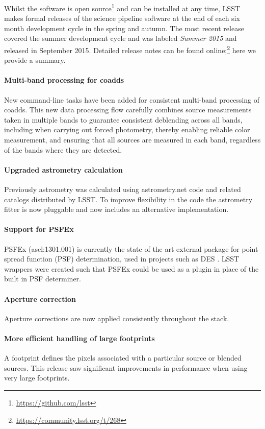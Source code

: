 \documentclass[11pt,twoside]{article}
\begin{document}
Whilst the software is open
source\footnote{\url{https://github.com/lsst}} and can be installed at
any time, LSST makes formal releases of the science pipeline software
at the end of each six month development cycle in the spring and
autumn. The most recent release covered the summer development cycle
and was labeled \emph{Summer 2015} and released in September
2015. Detailed release notes can be found
online;\footnote{\url{https://community.lsst.org/t/268}} here we
provide a summary.

\paragraph{Multi-band processing for coadds} New command-line tasks
have been added for consistent multi-band processing of coadds. This
new data processing flow carefully combines source measurements taken
in multiple bands to guarantee consistent deblending across all bands,
including when carrying out forced photometry, thereby enabling
reliable color measurement, and ensuring that all sources are
measured in each band, regardless of the bands where they are detected.

\paragraph{Upgraded astrometry calculation} Previously astrometry was
calculated using astrometry.net code \citep[][ascl:1208.001]{2010AJ....139.1782L} and
related catalogs distributed by LSST. To improve flexibility in the
code the astrometry fitter is now pluggable and now includes an
alternative implementation.

\paragraph{Support for PSFEx} PSFEx (ascl:1301.001) is currently the state of the art
external package for point spread function (PSF) determination, used
in projects such as DES \citep{2011ASPC..442..435B}. LSST wrappers
were created such that PSFEx could be used as a plugin in place of the
built in PSF determiner.

\paragraph{Aperture correction} Aperture corrections are now applied
consistently throughout the stack.

\paragraph{More efficient handling of large footprints} A footprint
defines the pixels associated with a particular source or blended
sources. This release saw significant improvements in performance when
using very large footprints.
\end{document}
